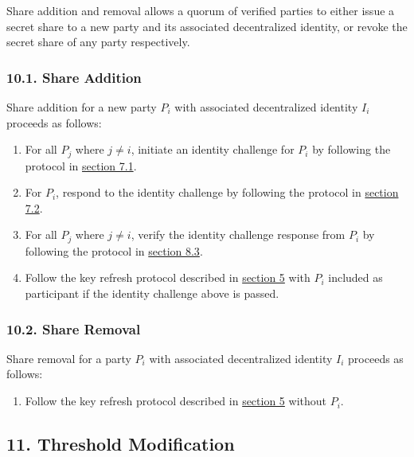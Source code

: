 \documentclass[
]{article}
\providecommand{\tightlist}{%
  \setlength{\itemsep}{0pt}\setlength{\parskip}{0pt}}
\begin{document}
Share addition and removal allows a quorum of verified parties to either
issue a secret share to a new party and its associated decentralized
identity, or revoke the secret share of any party respectively.

\hypertarget{share-addition}{%
\subsubsection{10.1. Share Addition}\label{share-addition}}

Share addition for a new party \(P_i\) with associated decentralized
identity \(I_i\) proceeds as follows:

\begin{enumerate}
\def\labelenumi{\arabic{enumi}.}
\tightlist
\item
  For all \(P_j\) where \(j \neq i\), initiate an identity challenge for
  \(P_i\) by following the protocol in
  \protect\hyperlink{identity-authed-request-initiation}{section 7.1}.
\item
  For \(P_i\), respond to the identity challenge by following the
  protocol in
  \protect\hyperlink{identity-authed-request-verification}{section 7.2}.
\item
  For all \(P_j\) where \(j \neq i\), verify the identity challenge
  response from \(P_i\) by following the protocol in
  \protect\hyperlink{identity-challenge-verification}{section 8.3}.
\item
  Follow the key refresh protocol described in
  \protect\hyperlink{key-refresh}{section 5} with \(P_i\) included as
  participant if the identity challenge above is passed.
\end{enumerate}

\hypertarget{share-removal}{%
\subsubsection{10.2. Share Removal}\label{share-removal}}

Share removal for a party \(P_i\) with associated decentralized identity
\(I_i\) proceeds as follows:

\begin{enumerate}
\def\labelenumi{\arabic{enumi}.}
\tightlist
\item
  Follow the key refresh protocol described in
  \protect\hyperlink{key-refresh}{section 5} without \(P_i\).
\end{enumerate}

\hypertarget{threshold-modification}{%
\subsection{11. Threshold Modification}\label{threshold-modification}}
\end{document}
